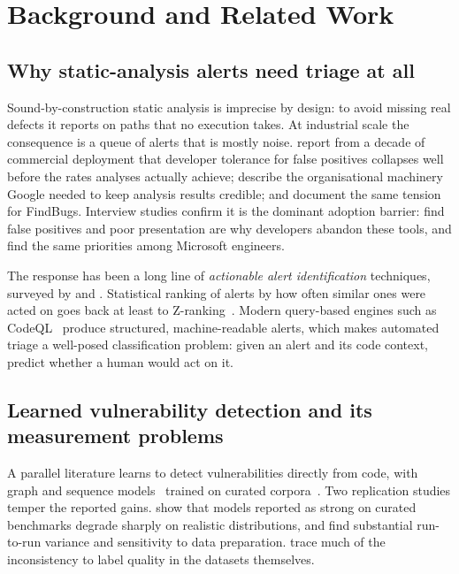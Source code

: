 \documentclass[journal]{IEEEtran}
\providecommand{\citep}[1]{\cite{#1}}
\providecommand{\citet}[1]{\cite{#1}}
\theoremstyle{definition}
\begin{document}
\section{Background and Related Work}
\label{sec:related}

\subsection{Why static-analysis alerts need triage at all}

Sound-by-construction static analysis is imprecise by design: to avoid missing
real defects it reports on paths that no execution takes. At industrial scale
the consequence is a queue of alerts that is mostly noise. \citet{bessey2010billion}
report from a decade of commercial deployment that developer tolerance for false
positives collapses well before the rates analyses actually achieve;
\citet{sadowski2018google} describe the organisational machinery Google needed to
keep analysis results credible; and \citet{ayewah2008findbugs} document the same
tension for FindBugs. Interview studies confirm it is the dominant adoption
barrier: \citet{johnson2013why} find false positives and poor presentation are
why developers abandon these tools, and \citet{christakis2016want} find the same
priorities among Microsoft engineers.

The response has been a long line of \emph{actionable alert identification}
techniques, surveyed by \citet{heckman2011slr} and \citet{muske2016survey}.
Statistical ranking of alerts by how often similar ones were acted on goes back
at least to Z-ranking~\citep{kremenek2003zranking}. Modern query-based engines
such as CodeQL~\citep{avgustinov2016ql} produce structured, machine-readable
alerts, which makes automated triage a well-posed classification problem: given
an alert and its code context, predict whether a human would act on it.

\subsection{Learned vulnerability detection and its measurement problems}

A parallel literature learns to detect vulnerabilities directly from code, with
graph and sequence models~\citep{zhou2019devign, li2018vuldeepecker} trained on
curated corpora~\citep{fan2020bigvul}. Two replication studies temper the
reported gains. \citet{chakraborty2022deep} show that models reported as strong
on curated benchmarks degrade sharply on realistic distributions, and
\citet{steenhoek2023empirical} find substantial run-to-run variance and
sensitivity to data preparation. \citet{croft2023dataquality} trace much of the
inconsistency to label quality in the datasets themselves.
\end{document}
